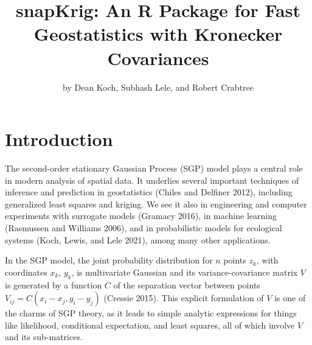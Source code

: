 \title{snapKrig: An R Package for Fast Geostatistics with Kronecker Covariances}
\author{by Dean Koch, Subhash Lele, and Robert Crabtree}

\maketitle


\hypertarget{introduction}{%
\section{Introduction}\label{introduction}}

The second-order stationary Gaussian Process (SGP) model plays a central role in modern analysis of spatial data. It underlies several important techniques of inference and prediction in geostatistics (Chiles and Delfiner 2012), including generalized least squares and kriging. We see it also in engineering and computer experiments with surrogate models (Gramacy 2016), in machine learning (Rasmussen and Williams 2006), and in probabilistic models for ecological systems (Koch, Lewis, and Lele 2021), among many other applications.

In the SGP model, the joint probability distribution for \(n\) points \(z_k\), with coordinates \(x_k\), \(y_k\), is multivariate Gaussian and its variance-covariance matrix \(V\) is generated by a function \(C\) of the separation vector between points \(V_{ij} = C ( x_i - x_j, y_i - y_j )\) (Cressie 2015). This explicit formulation of \(V\) is one of the charms of SGP theory, as it leads to simple analytic expressions for things like likelihood, conditional expectation, and least squares, all of which involve \(V\) and its sub-matrices.

